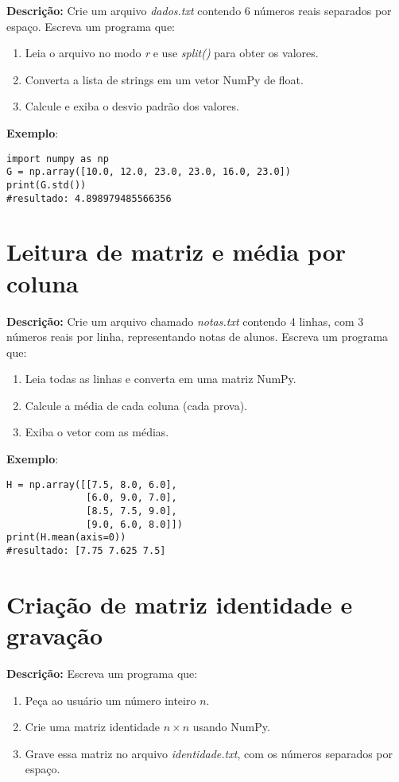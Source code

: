 \textbf{Descrição:} Crie um arquivo \textit{dados.txt} contendo 6 números reais separados por espaço. Escreva um programa que:

\begin{enumerate}
    \item Leia o arquivo no modo \textit{r} e use \textit{split()} para obter os valores.
    \item Converta a lista de strings em um vetor NumPy de float.
    \item Calcule e exiba o desvio padrão dos valores.
\end{enumerate}

\textbf{Exemplo}:
\begin{verbatim}
import numpy as np
G = np.array([10.0, 12.0, 23.0, 23.0, 16.0, 23.0])
print(G.std())
#resultado: 4.898979485566356
\end{verbatim}

\section{Leitura de matriz e média por coluna}

\textbf{Descrição:} Crie um arquivo chamado \textit{notas.txt} contendo 4 linhas, com 3 números reais por linha, representando notas de alunos. Escreva um programa que:

\begin{enumerate}
    \item Leia todas as linhas e converta em uma matriz NumPy.
    \item Calcule a média de cada coluna (cada prova).
    \item Exiba o vetor com as médias.
\end{enumerate}

\textbf{Exemplo}:
\begin{verbatim}
H = np.array([[7.5, 8.0, 6.0],
              [6.0, 9.0, 7.0],
              [8.5, 7.5, 9.0],
              [9.0, 6.0, 8.0]])
print(H.mean(axis=0))
#resultado: [7.75 7.625 7.5]
\end{verbatim}

\section{Criação de matriz identidade e gravação}

\textbf{Descrição:} Escreva um programa que:

\begin{enumerate}
    \item Peça ao usuário um número inteiro \( n \).
    \item Crie uma matriz identidade \( n \times n \) usando NumPy.
    \item Grave essa matriz no arquivo \textit{identidade.txt}, com os números separados por espaço.
\end{enumerate}

